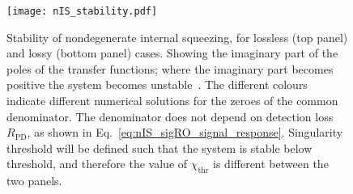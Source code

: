 \begin{figure}
    \centering
    \texttt{[image: nIS\_stability.pdf]}
    \caption{  Stability of nondegenerate internal squeezing, for lossless (top panel) and lossy (bottom panel) cases. Showing the imaginary part of the poles of the transfer functions; where the imaginary part becomes positive the system becomes unstable~\cite{}. The different colours indicate different numerical solutions for the zeroes of the common denominator. The denominator does not depend on detection loss $R_\text{PD}$, as shown in Eq.~\ref{eq:nIS_sigRO_signal_response}. Singularity threshold will be defined such that the system is stable below threshold, and therefore the value of $\chi_\text{thr}$ is different between the two panels.}
    \label{fig:nIS_stability}
\end{figure}


